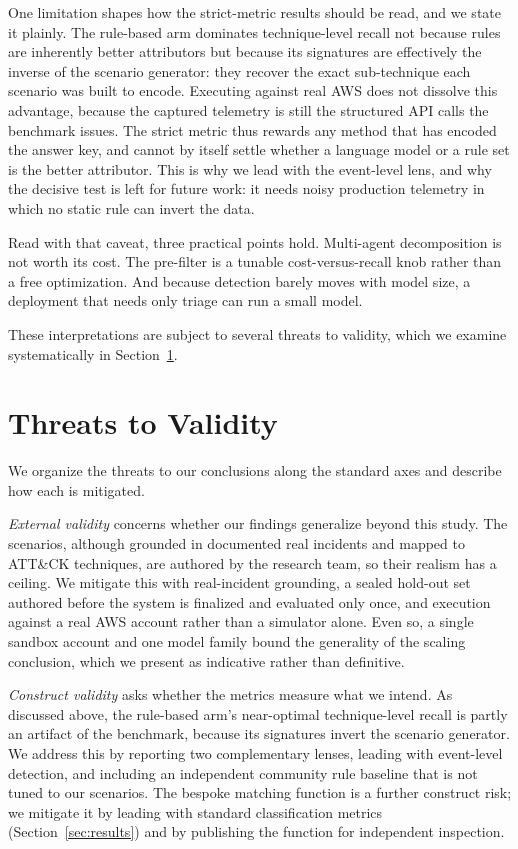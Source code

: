 \documentclass[journal]{IEEEtran}
\begin{document}
One limitation shapes how the strict-metric results should be read, and we state it plainly. The
rule-based arm dominates technique-level recall not because rules are inherently better attributors but
because its signatures are effectively the inverse of the scenario generator: they recover the exact
sub-technique each scenario was built to encode. Executing against real AWS does not dissolve this
advantage, because the captured telemetry is still the structured API calls the benchmark issues. The
strict metric thus rewards any method that has encoded the answer key, and cannot by itself settle
whether a language model or a rule set is the better attributor. This is why we lead with the
event-level lens, and why the decisive test is left for future work: it needs noisy production telemetry
in which no static rule can invert the data.

Read with that caveat, three practical points hold. Multi-agent decomposition is not worth its cost.
The pre-filter is a tunable cost-versus-recall knob rather than a free optimization. And because
detection barely moves with model size, a deployment that needs only triage can run a small model.

These interpretations are subject to several threats to validity, which we examine systematically in
Section~\ref{sec:threats}.

\section{Threats to Validity}\label{sec:threats}
We organize the threats to our conclusions along the standard axes and describe how each is mitigated.

\emph{External validity} concerns whether our findings generalize beyond this study. The scenarios,
although grounded in documented real incidents and mapped to ATT\&CK techniques, are authored by the
research team, so their realism has a ceiling. We mitigate this with real-incident grounding, a sealed
hold-out set authored before the system is finalized and evaluated only once, and execution against a
real AWS account rather than a simulator alone. Even so, a single sandbox account and one model family
bound the generality of the scaling conclusion, which we present as indicative rather than definitive.

\emph{Construct validity} asks whether the metrics measure what we intend. As discussed above, the
rule-based arm's near-optimal technique-level recall is partly an artifact of the benchmark, because its
signatures invert the scenario generator. We address this by reporting two complementary lenses, leading
with event-level detection, and including an independent community rule baseline that is not tuned to our
scenarios. The bespoke matching function is a further construct risk; we mitigate it by leading with
standard classification metrics (Section~\ref{sec:results}) and by publishing the function for
independent inspection.
\end{document}
